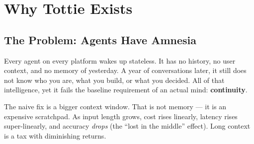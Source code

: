 \chapter{Why Tottie Exists}

\section{The Problem: Agents Have Amnesia}
Every agent on every platform wakes up stateless. It has no history, no user context, and no
memory of yesterday. A year of conversations later, it still does not know who you are, what you
build, or what you decided. All of that intelligence, yet it fails the baseline requirement of an
actual mind: \textbf{continuity}.

The naive fix is a bigger context window. That is not memory --- it is an expensive scratchpad. As
input length grows, cost rises linearly, latency rises super-linearly, and accuracy \emph{drops}
(the ``lost in the middle'' effect). Long context is a tax with diminishing returns.

